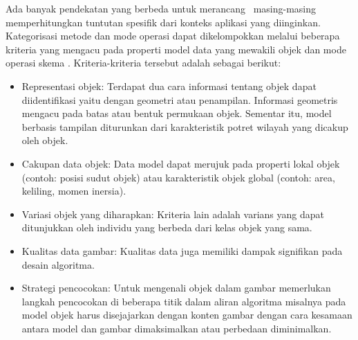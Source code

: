 Ada banyak pendekatan yang berbeda untuk merancang \objd\, masing-masing memperhitungkan tuntutan spesifik dari konteks aplikasi yang diinginkan. Kategorisasi metode dan mode operasi dapat dikelompokkan melalui beberapa kriteria yang mengacu pada properti model data yang mewakili objek dan mode operasi skema \objd. Kriteria-kriteria tersebut adalah sebagai berikut\cite{b8}:
\begin{itemize}
\item Representasi objek: Terdapat dua cara informasi tentang objek dapat diidentifikasi yaitu dengan geometri atau penampilan. Informasi geometris mengacu pada batas atau  bentuk permukaan objek. Sementar itu, model berbasis tampilan diturunkan dari karakteristik potret wilayah yang dicakup oleh objek.
\item Cakupan data objek: Data model dapat merujuk pada properti lokal objek (contoh: posisi sudut objek) atau karakteristik objek global (contoh: area, keliling, momen inersia).
\item Variasi objek yang diharapkan: Kriteria lain adalah varians yang dapat ditunjukkan oleh individu yang berbeda dari kelas objek yang sama.
\item Kualitas data gambar: Kualitas data juga memiliki dampak signifikan pada desain algoritma.
\item Strategi pencocokan: Untuk mengenali objek dalam gambar memerlukan langkah pencocokan di beberapa titik dalam aliran algoritma misalnya pada model objek harus disejajarkan dengan konten gambar dengan cara kesamaan antara model dan gambar dimaksimalkan atau perbedaan diminimalkan.
\end{itemize}


